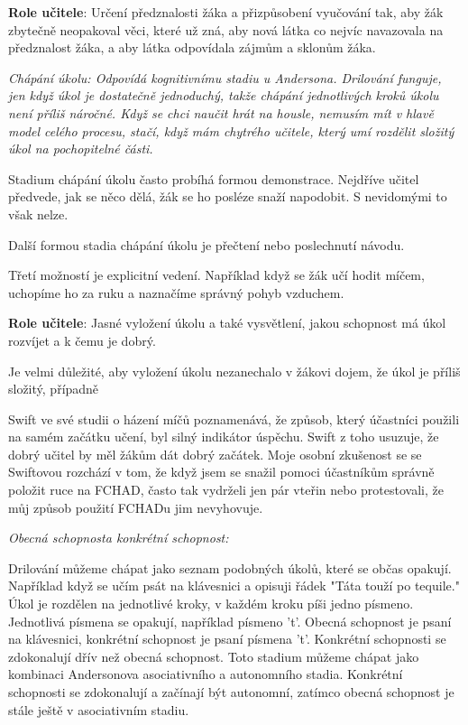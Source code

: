 {\bf Role učitele}: Určení předznalosti žáka a přizpůsobení vyučování tak, aby žák zbytečně neopakoval věci, které už zná, aby nová látka co nejvíc navazovala na předznalost žáka, a aby látka odpovídala zájmům a sklonům žáka.

\em Chápání úkolu\em : Odpovídá kognitivnímu stadiu u Andersona. Drilování funguje, jen když úkol je dostatečně jednoduchý, takže chápání jednotlivých kroků úkolu není příliš náročné.  Když se chci naučit hrát na housle, nemusím mít v hlavě model celého procesu, stačí, když mám chytrého učitele, který umí rozdělit složitý úkol na pochopitelné části.

Stadium chápání úkolu často probíhá formou demonstrace.  Nejdříve učitel předvede, jak se něco dělá, žák se ho posléze snaží napodobit.  S nevidomými to však nelze.

Další formou stadia chápání úkolu je přečtení nebo poslechnutí návodu.

Třetí možností je explicitní vedení.  Například když se žák učí hodit míčem, uchopíme ho za ruku a naznačíme správný pohyb vzduchem.

{\bf Role učitele}: Jasné vyložení úkolu a také vysvětlení, jakou schopnost má úkol rozvíjet a k čemu je dobrý.

Je velmi důležité, aby vyložení úkolu nezanechalo v žákovi dojem, že úkol je příliš složitý, případně 

Swift ve své studii o házení míčů poznamenává, že způsob, který účastníci použili na samém začátku učení, byl silný indikátor úspěchu. Swift z toho usuzuje, že dobrý učitel by měl žákům dát dobrý začátek.   \citep[str. 215]{swift1903studies}  Moje osobní zkušenost se se Swiftovou rozchází v tom, že když jsem se snažil pomoci účastníkům správně položit ruce na FCHAD, často tak vydrželi jen pár vteřin nebo protestovali, že můj způsob použití FCHADu jim nevyhovuje.

\em Obecná schopnost\em  a \em konkrétní schopnost\em :

Drilování můžeme chápat jako seznam podobných úkolů, které se občas opakují.  Například když se učím psát na klávesnici a opisuji řádek "Táta touží po tequile." Úkol je rozdělen na jednotlivé kroky, v každém kroku píši jedno písmeno.  Jednotlivá písmena se opakují, například písmeno 't'.  Obecná schopnost je psaní na klávesnici, konkrétní schopnost je psaní písmena 't'. Konkrétní schopnosti se zdokonalují dřív než obecná schopnost.  Toto stadium můžeme chápat jako kombinaci Andersonova asociativního a autonomního stadia.  Konkrétní schopnosti se zdokonalují a začínají být autonomní, zatímco obecná schopnost je stále ještě v asociativním stadiu.

